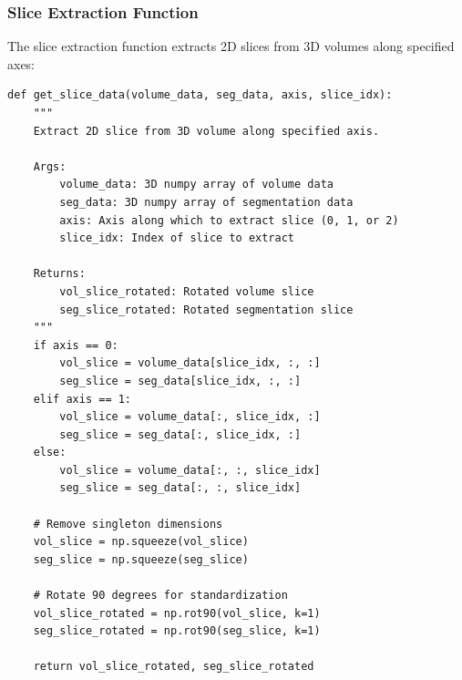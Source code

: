 \documentclass[12pt,a4paper]{article}
\begin{document}
\subsubsection{Slice Extraction Function}
The slice extraction function extracts 2D slices from 3D volumes along specified axes:
\begin{lstlisting}
def get_slice_data(volume_data, seg_data, axis, slice_idx):
    """
    Extract 2D slice from 3D volume along specified axis.
    
    Args:
        volume_data: 3D numpy array of volume data
        seg_data: 3D numpy array of segmentation data
        axis: Axis along which to extract slice (0, 1, or 2)
        slice_idx: Index of slice to extract
    
    Returns:
        vol_slice_rotated: Rotated volume slice
        seg_slice_rotated: Rotated segmentation slice
    """
    if axis == 0:
        vol_slice = volume_data[slice_idx, :, :]
        seg_slice = seg_data[slice_idx, :, :]
    elif axis == 1:
        vol_slice = volume_data[:, slice_idx, :]
        seg_slice = seg_data[:, slice_idx, :]
    else:
        vol_slice = volume_data[:, :, slice_idx]
        seg_slice = seg_data[:, :, slice_idx]
    
    # Remove singleton dimensions
    vol_slice = np.squeeze(vol_slice)
    seg_slice = np.squeeze(seg_slice)
    
    # Rotate 90 degrees for standardization
    vol_slice_rotated = np.rot90(vol_slice, k=1)
    seg_slice_rotated = np.rot90(seg_slice, k=1)
    
    return vol_slice_rotated, seg_slice_rotated
\end{lstlisting}
\end{document}
